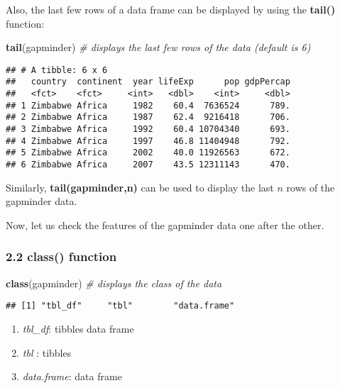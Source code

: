 \documentclass[]{article}
\newenvironment{Shaded}{\begin{snugshade}}{\end{snugshade}}
\newcommand{\KeywordTok}[1]{\textcolor[rgb]{0.13,0.29,0.53}{\textbf{{#1}}}}
\newcommand{\CommentTok}[1]{\textcolor[rgb]{0.56,0.35,0.01}{\textit{{#1}}}}
\newcommand{\NormalTok}[1]{{#1}}
\providecommand{\tightlist}{%
  \setlength{\itemsep}{0pt}\setlength{\parskip}{0pt}}
\begin{document}
Also, the last few rows of a data frame can be displayed by using the
\textbf{tail()} function:

\begin{Shaded}
\begin{Highlighting}[]
\KeywordTok{tail}\NormalTok{(gapminder) }\CommentTok{# displays the last few rows of the data (default is 6)}
\end{Highlighting}
\end{Shaded}

\begin{verbatim}
## # A tibble: 6 x 6
##   country  continent  year lifeExp      pop gdpPercap
##   <fct>    <fct>     <int>   <dbl>    <int>     <dbl>
## 1 Zimbabwe Africa     1982    60.4  7636524      789.
## 2 Zimbabwe Africa     1987    62.4  9216418      706.
## 3 Zimbabwe Africa     1992    60.4 10704340      693.
## 4 Zimbabwe Africa     1997    46.8 11404948      792.
## 5 Zimbabwe Africa     2002    40.0 11926563      672.
## 6 Zimbabwe Africa     2007    43.5 12311143      470.
\end{verbatim}

Similarly, \textbf{tail(gapminder,n)} can be used to display the last
\(n\) rows of the gapminder data.

Now, let us check the features of the gapminder data one after the
other.

\subsubsection{\texorpdfstring{2.2 \textbf{class()}
function}{2.2 class() function}}\label{class-function}

\begin{Shaded}
\begin{Highlighting}[]
\KeywordTok{class}\NormalTok{(gapminder)  }\CommentTok{# displays the class of the data}
\end{Highlighting}
\end{Shaded}

\begin{verbatim}
## [1] "tbl_df"     "tbl"        "data.frame"
\end{verbatim}

\begin{enumerate}
\def\labelenumi{\arabic{enumi}.}
\tightlist
\item
  \emph{tbl\_df}: tibbles data frame
\item
  \emph{tbl} : tibbles
\item
  \emph{data.frame}: data frame
\end{enumerate}
\end{document}
